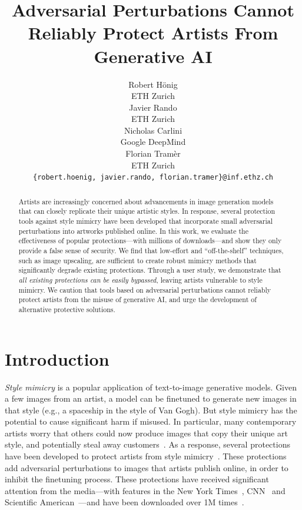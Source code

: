 \documentclass{article}
\title{Adversarial Perturbations Cannot Reliably Protect Artists From Generative AI
}
\author{%
  Robert H\"onig \\
  ETH Zurich\\
  \And
  Javier Rando \\
  ETH Zurich \\
  \And
  Nicholas Carlini \\
  Google DeepMind \\
  \And
  Florian Tram\`er \\
  ETH Zurich \\
  \And
\texttt{\{robert.hoenig, javier.rando, florian.tramer\}@inf.ethz.ch}
}
\begin{document}
\maketitle


\begin{abstract}
Artists are increasingly concerned about advancements in image generation models that can closely replicate their unique artistic styles.
In response, several protection tools against style mimicry have been developed that incorporate small adversarial perturbations into artworks published online.
In this work, we evaluate the effectiveness of popular protections---with millions of downloads---and show they only provide a false sense of security.
We find that low-effort and ``off-the-shelf'' techniques, such as image upscaling, are sufficient to create {robust mimicry methods} that significantly degrade existing protections.
Through a user study, we demonstrate that \emph{all existing protections can be easily bypassed}, leaving artists vulnerable to style mimicry. 
We caution that tools based on adversarial perturbations cannot reliably protect artists from the misuse of generative AI, and urge the development of alternative protective solutions.

\end{abstract}

\section{Introduction}

\emph{Style mimicry} is a popular application of text-to-image generative models. Given a few images from an artist, a model can be finetuned to generate new images in that style (e.g., a spaceship in the style of Van Gogh).
But style mimicry has the potential to cause significant harm if misused. In particular, many contemporary artists worry that others could now produce images that copy their unique art style, and potentially steal away customers~\citep{techreview}.
As a response, several protections have been developed to protect artists from style mimicry~\citep{glaze, antidreambooth, mist}.
These protections add adversarial perturbations to images that artists publish online, in order to inhibit the finetuning process.
These protections have received significant attention from the media---with features in the New York Times~\citep{hill2023tool}, CNN~\citep{cnn} and Scientific American~\citep{scientificamerican}---and have been downloaded over 1M times~\citep{glaze}.
\end{document}
